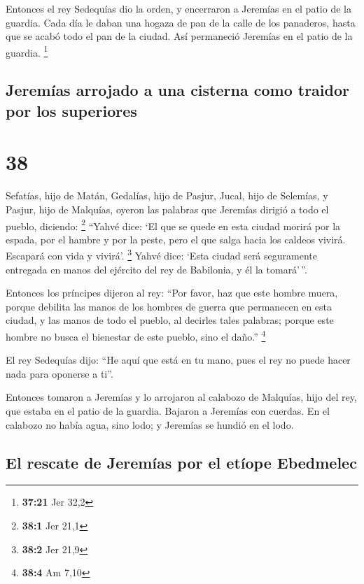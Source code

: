  Entonces el rey Sedequías dio la orden, y encerraron a
Jeremías en el patio de la guardia. Cada día le daban una hogaza de pan
de la calle de los panaderos, hasta que se acabó todo el pan de la
ciudad. Así permaneció Jeremías en el patio de la guardia. \footnote{\textbf{37:21}
  Jer 32,2}

\hypertarget{jeremuxedas-arrojado-a-una-cisterna-como-traidor-por-los-superiores}{%
\subsection{Jeremías arrojado a una cisterna como traidor por los
superiores}\label{jeremuxedas-arrojado-a-una-cisterna-como-traidor-por-los-superiores}}

\hypertarget{section-37}{%
\section{38}\label{section-37}}

 Sefatías, hijo de Matán, Gedalías, hijo de Pasjur, Jucal,
hijo de Selemías, y Pasjur, hijo de Malquías, oyeron las palabras que
Jeremías dirigió a todo el pueblo, diciendo: \footnote{\textbf{38:1} Jer
  21,1}  ``Yahvé dice: `El que se quede en esta ciudad
morirá por la espada, por el hambre y por la peste, pero el que salga
hacia los caldeos vivirá. Escapará con vida y vivirá'. \footnote{\textbf{38:2}
  Jer 21,9}  Yahvé dice: `Esta ciudad será seguramente
entregada en manos del ejército del rey de Babilonia, y él la
tomará'\,''.

 Entonces los príncipes dijeron al rey: ``Por favor, haz
que este hombre muera, porque debilita las manos de los hombres de
guerra que permanecen en esta ciudad, y las manos de todo el pueblo, al
decirles tales palabras; porque este hombre no busca el bienestar de
este pueblo, sino el daño.'' \footnote{\textbf{38:4} Am 7,10}

 El rey Sedequías dijo: ``He aquí que está en tu mano,
pues el rey no puede hacer nada para oponerse a ti''.

 Entonces tomaron a Jeremías y lo arrojaron al calabozo de
Malquías, hijo del rey, que estaba en el patio de la guardia. Bajaron a
Jeremías con cuerdas. En el calabozo no había agua, sino lodo; y
Jeremías se hundió en el lodo.

\hypertarget{el-rescate-de-jeremuxedas-por-el-etuxedope-ebedmelec}{%
\subsection{El rescate de Jeremías por el etíope
Ebedmelec}\label{el-rescate-de-jeremuxedas-por-el-etuxedope-ebedmelec}}

